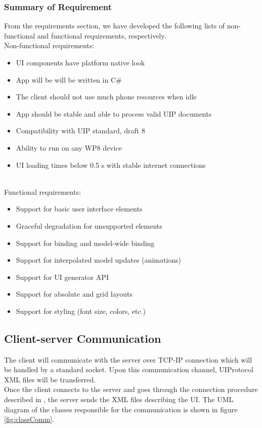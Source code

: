 \subsubsection{Summary of Requirement}
From the requirements section, we have developed the following lists of non-functional and functional requirements, respectively.
\\
Non-functional requirements:
\begin{itemize}
  \item UI components have platform native look
  \item App will be will be written in C\#
  \item The client should not use much phone resources when idle
  \item App should be stable and able to process valid UIP documents
  \item Compatibility with UIP standard, draft 8
  \item Ability to run on any WP8 device
  \item UI loading times below 0.5 s with stable internet connections
\end{itemize}
~\\
Functional requirements:
\begin{itemize}
  \item  Support for basic user interface elements
  \item Graceful degradation for unsupported elements
  \item  Support for binding and model-wide binding
  \item  Support for interpolated model updates (animations)
  \item  Support for UI generator API
  \item Support for absolute and grid layouts
  \item Support for styling (font size, colors, etc.)
\end{itemize}

\subsection{Client-server Communication}
The client will communicate with the server over TCP-IP connection which will be handled by a standard socket. Upon this communication channel, UIProtocol XML files will be transferred.\\
Once the client connects to the server and goes through the connection procedure described in \cite{uip}, the server sends the XML files describing the UI. The UML diagram of the classes responsible for the communication is shown in figure \ref{fig:classComm}.

